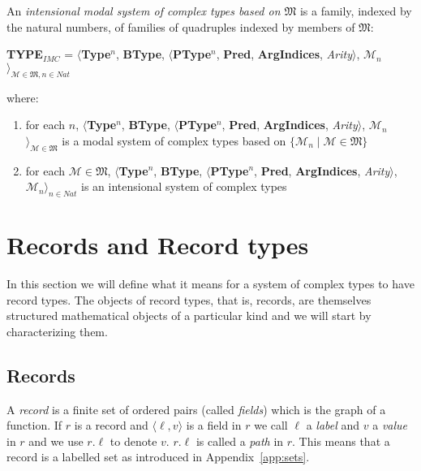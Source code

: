 An {\it intensional modal system of complex types based on $\mathfrak{M}$\/} is a family,
indexed by the natural numbers, of families of quadruples indexed by
members of $\mathfrak{M}$:
\begin{display}
{\bf TYPE$_\mathit{IMC}$} = $\langle${\bf Type}$^n$, {\bf BType},
$\langle$\textbf{PType}$^n$, {\bf Pred}, \textbf{ArgIndices}, {\it
  Arity\/}$\rangle$, $\mathscr{M}_n$$\rangle_{\mathscr{M}\in\mathfrak{M},n\in\mathit{Nat}}$
\end{display}
where:
\begin{enumerate} 
 
\item for each $n$, $\langle${\bf Type}$^n$, {\bf BType},
$\langle$\textbf{PType}$^n$, {\bf Pred}, \textbf{ArgIndices}, {\it
  Arity\/}$\rangle$, $\mathscr{M}_n$$\rangle_{\mathscr{M}\in\mathfrak{M}}$ is a modal
  system of complex types based on $\{\mathscr{M}_n\mid \mathscr{M}\in\mathfrak{M}\}$ 
 
\item for each $\mathscr{M}\in\mathfrak{M}$, $\langle${\bf Type}$^n$, {\bf BType},
$\langle$\textbf{PType}$^n$, {\bf Pred}, \textbf{ArgIndices}, {\it
  Arity\/}$\rangle$, $\mathscr{M}_n$$\rangle_{n\in\mathit{Nat}}$ is an
  intensional system of complex types
 
\end{enumerate} 
 


\section{Records and Record types}
\label{app:rectypes}

In this section we will define what it means for a system of complex
types to have record types.  The objects of record types, that is,
records, are themselves structured mathematical objects of a
particular kind and we will
start by characterizing them.

\subsection{Records}

A {\it record\/} is a finite set of ordered pairs (called {\it fields\/})
which is the graph of a function.  If $r$ is a record and $\langle\ell,v\rangle$
is a field in $r$ we call $\ell$ a {\it label\/} and $v$ a {\it value\/} in $r$
and we use $r.\ell$ to denote $v$.  $r.\ell$ is called a \textit{path}
in $r$.  This means that a record is a labelled set as introduced in Appendix~\ref{app:sets}.

